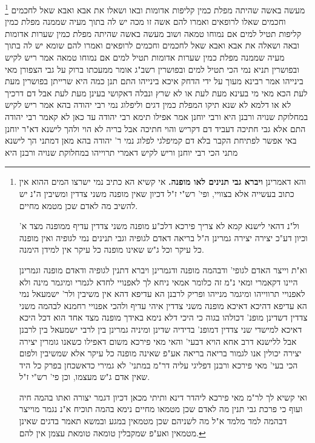 \documentclass[12pt, openany]{book}
\newcommand{\footnotecomment}[1]{
	\renewcommand\thefootnote{}
	\footnote{#1}}
\newcommand{\commenta}[1]{\footnotecomment{#1}}
\begin{document}
{\commenta{ והא דאמרינן \textbf{ויברא גבי תנינים לאו מופנה.} אי קשיא הא כתיב נמי ישרצו המים ההוא אין כתוב בעשייה אלא בצוויי, ופי' רש"י ז"ל דכיון שאין מופנה משני צדדין ומשיבין ה"נ יש להשיב מה לאדם שכן מטמא מחיים.\par ול"נ דהאי לישנא קמא לא צריך פירכא דלכ"ע מופנה משני צדדין עדיף ממופנה מצד א' וכיון דע"כ יצירה יצירה גמרינן ה"ל בריאה דאדם לגופיה וגבי תנינים נמי לגופיה ואין מופנה כל עיקר וכל ג"ש שאינו מופנה כל עיקר אין למידן הימנה.\par וא"ת וייצר האדם לגופי' ודבהמה מופנה ודגמרינן ויברא דתנין לגופיה ודאדם מופנה וגמרינן היינו דקאמרי ומאי נ"מ זה כלומר אמאי ניחא לך לאפנויי לחדא לגמרי ומיגמר מינה ולא לאפנויי תרווייהו ומיגמר מנייהו ופריק לרבנן הא עדיפא דהא אין משיבין ולר' ישמעאל נמי הא עדיפא דהיכא דאיכא מופנה משני צדדין איהי עדיף ולהכי אפנויי רחמנא לבהמה משני צדדין דשדינן מופנ' דכולהו בגוה כי היכי דלא נימא באידך מופנה מצד אחד הוא דכל היכא דאיכא למישדי שני צדדין דמופנ' בדידיה שדינן ומיניה גמרינן בין לרבי ישמעאל בין לרבנן אבל ללישנא דרב אחא הויא דבעי' והאי מאי פירכא משום דאפילו כשאנו גומרין יצירה יצירה יכולין אנו לגמור בריאה בריאה אע"פ שאינה מופנה כל עיקר אלא שמשיבין ולפום הכי בעי' מאי פירכא ורבנן דפליגי עליה דר"מ במתני' לא גמירי כדאשכחן בפרק כל היד שאין אדם ג"ש מעצמו, וכן פי' רש"י ז"ל.\par ואי קשיא לך לר"מ מאי פירכא ליהדר דינא ותיתי מכאן דכיון דגמר יצורה ואתו בהמה חיה ועוף כי פרכת גבי תנין מה לאדם שכן מטמאו מחיים נימא בהמה תוכיח א"נ נגמר מוייצר דבהמה למד מלמד א"ל מה לשניהם שכן מטמאין במגע ובמשא תאמר בדגים שאינן מטמאין ואע"פ שמקבלין טומאה טומאת עצמן אין להם. }
מעשה באשה שהיתה מפלת כמין קליפות אדומות ובאו ושאלו את אבא ואבא שאל לחכמים וחכמים שאלו לרופאים ואמרו להם אשה זו מכה יש לה בתוך מעיה שממנה מפלת כמין קליפות תטיל למים אם נמוחו טמאה 
ושוב מעשה באשה שהיתה מפלת כמין שערות אדומות ובאה ושאלה את אבא ואבא שאל לחכמים וחכמים לרופאים ואמרו להם שומא יש לה בתוך מעיה שממנה מפלת כמין שערות אדומות תטיל למים אם נמוחו טמאה 
אמר ריש לקיש ובפושרין תניא נמי הכי תטיל למים ובפושרין רשב"ג אומר ממעכתו ברוק על גבי הצפורן מאי בינייהו אמר רבינא מעוך על ידי הדחק איכא בינייהו 
התם תנן כמה היא שרייתן בפושרין מעת לעת הכא מאי מי בעינא מעת לעת או לא 
שרץ ונבלה דאקושי בעינן מעת לעת אבל דם דרכיך לא או דלמא לא שנא תיקו
המפלת כמין דגים וליפלוג נמי רבי יהודה בהא 
אמר ריש לקיש במחלוקת שנויה ורבנן היא ורבי יוחנן אמר אפילו תימא רבי יהודה עד כאן לא קאמר רבי יהודה התם אלא גבי חתיכה דעביד דם דקריש והוי חתיכה אבל בריה לא הוי 
ולהך לישנא דא"ר יוחנן באי אפשר לפתיחת הקבר בלא דם קמיפלגי לפלוג נמי ר' יהודה בהא 
מאן דמתני הך לישנא מתני הכי רבי יוחנן וריש לקיש דאמרי תרוייהו במחלוקת שנויה ורבנן היא
}
\end{document}
